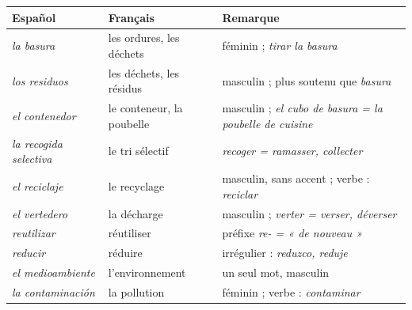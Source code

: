 \documentclass[11pt]{article}
\newcommand{\esp}[1]{\ifmmode\text{\textit{#1}}\else\begingroup\selectlanguage{spanish}\itshape #1\endgroup\fi}
\begin{document}
\begin{definition}
\begin{center}
\begin{tabularx}{\linewidth}{|X|X|X|}\hline
\rowcolor{popblueL} \textbf{Español} & \textbf{Français} & \textbf{Remarque} \\ \hline
\esp{la basura} & les ordures, les déchets & féminin ; \esp{tirar la basura} \\ \hline
\esp{los residuos} & les déchets, les résidus & masculin ; plus soutenu que \esp{basura} \\ \hline
\esp{el contenedor} & le conteneur, la poubelle & masculin ; \esp{el cubo de basura} = la poubelle de cuisine \\ \hline
\esp{la recogida selectiva} & le tri sélectif & \esp{recoger} = ramasser, collecter \\ \hline
\esp{el reciclaje} & le recyclage & masculin, sans accent ; verbe : \esp{reciclar} \\ \hline
\esp{el vertedero} & la décharge & masculin ; \esp{verter} = verser, déverser \\ \hline
\esp{reutilizar} & réutiliser & préfixe \esp{re-} = « de nouveau » \\ \hline
\esp{reducir} & réduire & irrégulier : \esp{reduzco}, \esp{reduje} \\ \hline
\esp{el medioambiente} & l'environnement & un seul mot, masculin \\ \hline
\esp{la contaminación} & la pollution & féminin ; verbe : \esp{contaminar} \\ \hline
\end{tabularx}
\end{center}
\end{definition}
\end{document}
